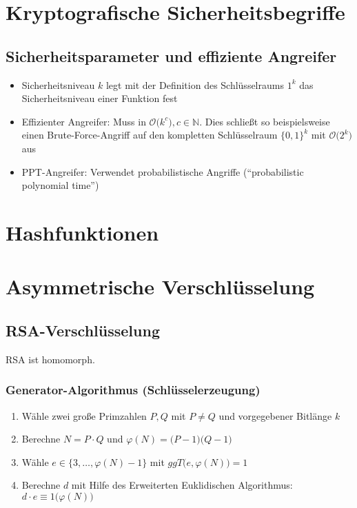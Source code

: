 \section{Kryptografische Sicherheitsbegriffe}

\subsection{Sicherheitsparameter und effiziente Angreifer}
\begin{itemize}
	\item Sicherheitsniveau \(k\) legt mit der Definition des Schlüsselraums \(1^k\) das Sicherheitsniveau einer Funktion fest
	\item Effizienter Angreifer: Muss in \(\mathcal{O}\big(k^c\big), c \in \mathbb{N}\). Dies schließt so beispielsweise einen Brute-Force-Angriff auf den kompletten Schlüsselraum \(\{0,1\}^k\) mit \(\mathcal{O}\big(2^k\big)\) aus
	\item PPT-Angreifer: Verwendet probabilistische Angriffe ("`probabilistic polynomial time"')
\end{itemize}



\section{Hashfunktionen}



\section{Asymmetrische Verschlüsselung}

\subsection{RSA-Verschlüsselung}
RSA ist homomorph.

\subsubsection{Generator-Algorithmus (Schlüsselerzeugung)}
\begin{enumerate}
	\item Wähle zwei große Primzahlen \(P,Q\) mit \(P \neq Q\) und vorgegebener Bitlänge \(k\)
	\item Berechne \(N = P \cdot Q\) und \(\varphi(N) = \big(P-1\big)\big(Q-1\big)\)
	\item Wähle \(e \in \{3,\ldots,\varphi(N)-1\}\) mit \(ggT\big(e, \varphi(N)\big) = 1\)
	\item Berechne \(d\) mit Hilfe des Erweiterten Euklidischen Algorithmus: \(d \cdot e \equiv 1 \big(\varphi(N)\big)\)
\end{enumerate}

